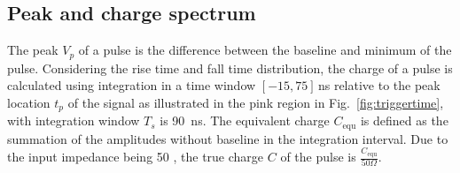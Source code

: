 




\subsection{Peak and charge spectrum}
\label{sec:noisepeak}

The peak $V_p$ of a pulse is the difference between the baseline and minimum of the pulse. Considering the rise time and fall time distribution, the charge of a pulse is calculated using integration in a time window $[-15, 75]$\,ns relative to the peak location $t_p$ of the signal as illustrated in the pink region in Fig.~\ref{fig:triggertime}, with integration window $T_s$ is \SI{90}{ns}. The equivalent charge $C_{\mathrm{equ}}$ is defined as the summation of the amplitudes without baseline in the integration interval. Due to the input impedance being \SI{50}{\Omega} \cite{CAENV1751}, the true charge $C$ of the pulse is $\frac{C_{\mathrm{equ}}}{50 \Omega}$.


